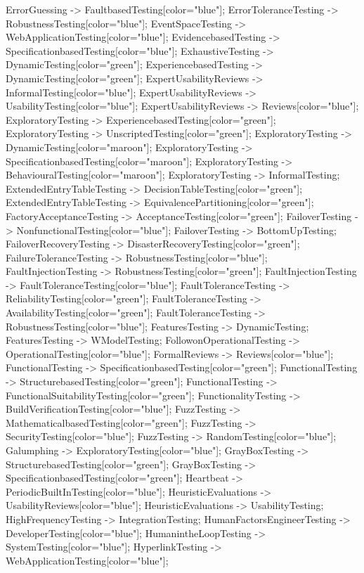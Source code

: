 \documentclass{article}
\begin{document}
{ErrorGuessing -> FaultbasedTesting[color="blue"];
ErrorToleranceTesting -> RobustnessTesting[color="blue"];
EventSpaceTesting -> WebApplicationTesting[color="blue"];
EvidencebasedTesting -> SpecificationbasedTesting[color="blue"];
ExhaustiveTesting -> DynamicTesting[color="green"];
ExperiencebasedTesting -> DynamicTesting[color="green"];
ExpertUsabilityReviews -> InformalTesting[color="blue"];
ExpertUsabilityReviews -> UsabilityTesting[color="blue"];
ExpertUsabilityReviews -> Reviews[color="blue"];
ExploratoryTesting -> ExperiencebasedTesting[color="green"];
ExploratoryTesting -> UnscriptedTesting[color="green"];
ExploratoryTesting -> DynamicTesting[color="maroon"];
ExploratoryTesting -> SpecificationbasedTesting[color="maroon"];
ExploratoryTesting -> BehaviouralTesting[color="maroon"];
ExploratoryTesting -> InformalTesting;
ExtendedEntryTableTesting -> DecisionTableTesting[color="green"];
ExtendedEntryTableTesting -> EquivalencePartitioning[color="green"];
FactoryAcceptanceTesting -> AcceptanceTesting[color="green"];
FailoverTesting -> NonfunctionalTesting[color="blue"];
FailoverTesting -> BottomUpTesting;
FailoverRecoveryTesting -> DisasterRecoveryTesting[color="green"];
FailureToleranceTesting -> RobustnessTesting[color="blue"];
FaultInjectionTesting -> RobustnessTesting[color="green"];
FaultInjectionTesting -> FaultToleranceTesting[color="blue"];
FaultToleranceTesting -> ReliabilityTesting[color="green"];
FaultToleranceTesting -> AvailabilityTesting[color="green"];
FaultToleranceTesting -> RobustnessTesting[color="blue"];
FeaturesTesting -> DynamicTesting;
FeaturesTesting -> WModelTesting;
FollowonOperationalTesting -> OperationalTesting[color="blue"];
FormalReviews -> Reviews[color="blue"];
FunctionalTesting -> SpecificationbasedTesting[color="green"];
FunctionalTesting -> StructurebasedTesting[color="green"];
FunctionalTesting -> FunctionalSuitabilityTesting[color="green"];
FunctionalityTesting -> BuildVerificationTesting[color="blue"];
FuzzTesting -> MathematicalbasedTesting[color="green"];
FuzzTesting -> SecurityTesting[color="blue"];
FuzzTesting -> RandomTesting[color="blue"];
Galumphing -> ExploratoryTesting[color="blue"];
GrayBoxTesting -> StructurebasedTesting[color="green"];
GrayBoxTesting -> SpecificationbasedTesting[color="green"];
Heartbeat -> PeriodicBuiltInTesting[color="blue"];
HeuristicEvaluations -> UsabilityReviews[color="blue"];
HeuristicEvaluations -> UsabilityTesting;
HighFrequencyTesting -> IntegrationTesting;
HumanFactorsEngineerTesting -> DeveloperTesting[color="blue"];
HumanintheLoopTesting -> SystemTesting[color="blue"];
HyperlinkTesting -> WebApplicationTesting[color="blue"];
}
\end{document}

